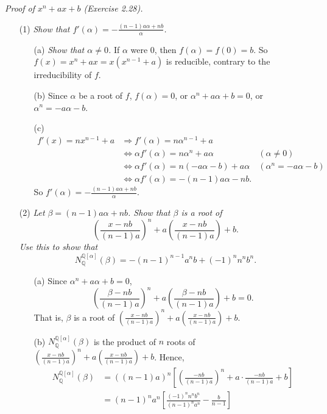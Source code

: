 \documentclass{article}
\begin{document}
\emph{Proof of $x^n + ax + b$ (Exercise 2.28).}
\begin{enumerate}
\item[(1)]
\emph{Show that $f'(\alpha) = -\frac{(n-1)a\alpha+nb}{\alpha}$.}
  \begin{enumerate}
  \item[(a)]
  \emph{Show that $\alpha \neq 0$.}
  If $\alpha$ were $0$, then $f(\alpha) = f(0) = b$.
  So $f(x) = x^n+ax = x(x^{n-1}+a)$ is reducible, contrary to the irreducibility of $f$.
  \item[(b)]
  Since $\alpha$ be a root of $f$,
  $f(\alpha) = 0$,
  or $\alpha^n + a\alpha + b = 0$,
  or $\alpha^n = -a\alpha-b$.
  \item[(c)]
  \begin{align*}
  f'(x) = nx^{n-1} + a
  &\Longrightarrow
  f'(\alpha) = n\alpha^{n-1} + a \\
  &\Longleftrightarrow
  \alpha f'(\alpha) = n\alpha^n + a\alpha
    &(\alpha \neq 0) \\
  &\Longleftrightarrow
  \alpha f'(\alpha) = n(-a\alpha-b) + a\alpha
    &(\alpha^n = -a\alpha-b) \\
  &\Longleftrightarrow
  \alpha f'(\alpha) = -(n-1)a\alpha-nb.
  \end{align*}
  So $f'(\alpha) = -\frac{(n-1)a\alpha+nb}{\alpha}$.
  \end{enumerate}
\item[(2)]
\emph{
Let $\beta = (n-1)a\alpha+nb$.
Show that $\beta$ is a root of
$$\left( \frac{x-nb}{(n-1)a} \right)^n + a\left( \frac{x-nb}{(n-1)a} \right) + b.$$
Use this to show that
$$N_{\mathbb{Q}}^{\mathbb{Q}[\alpha]}(\beta) = -(n-1)^{n-1}a^nb+(-1)^n n^n b^n.$$}
  \begin{enumerate}
  \item[(a)]
  Since $\alpha^n + a\alpha + b = 0$,
  $$\left( \frac{\beta-nb}{(n-1)a} \right)^n
    + a\left( \frac{\beta-nb}{(n-1)a} \right) + b = 0.$$
  That is, $\beta$ is a root of
  $\left( \frac{x-nb}{(n-1)a} \right)^n + a\left( \frac{x-nb}{(n-1)a} \right) + b$.
  \item[(b)]
  $N_{\mathbb{Q}}^{\mathbb{Q}[\alpha]}(\beta)$ is the product of $n$ roots of
  $\left( \frac{x-nb}{(n-1)a} \right)^n + a\left( \frac{x-nb}{(n-1)a} \right) + b$.
  Hence,
  \begin{align*}
  N_{\mathbb{Q}}^{\mathbb{Q}[\alpha]}(\beta)
  &= ((n-1)a)^n\left[ \left(\frac{-nb}{(n-1)a}\right)^n
    + a \cdot \frac{-nb}{(n-1)a} + b \right] \\
  &= (n-1)^n a^n\left[ \frac{(-1)^n n^n b^n}{(n-1)^n a^n} - \frac{b}{n-1} \right] \\

\end{align*}
\end{enumerate}
\end{enumerate}
\end{document}

